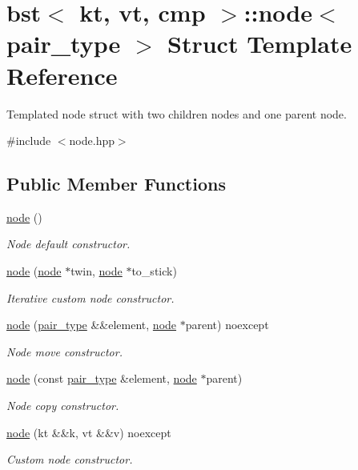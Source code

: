 \hypertarget{structbst_1_1node}{}\section{bst$<$ kt, vt, cmp $>$\+:\+:node$<$ pair\+\_\+type $>$ Struct Template Reference}
\label{structbst_1_1node}


Templated node struct with two children nodes and one parent node.  




{\ttfamily \#include $<$node.\+hpp$>$}

\subsection*{Public Member Functions}
\begin{DoxyCompactItemize}
\item 
\hyperlink{structbst_1_1node_a79aa79c3ff256126de5fdc848ec88b45}{node} ()
\begin{DoxyCompactList}\small\item\em Node default constructor. \end{DoxyCompactList}\item 
\hyperlink{structbst_1_1node_a87b48a3770bbaa16830f8bbb635edd38}{node} (\hyperlink{structbst_1_1node}{node} $\ast$twin, \hyperlink{structbst_1_1node}{node} $\ast$to\+\_\+stick)
\begin{DoxyCompactList}\small\item\em Iterative custom node constructor. \end{DoxyCompactList}\item 
\hyperlink{structbst_1_1node_afb49ebb92c139b1a3fdaf71048b0dc1a}{node} (\hyperlink{classbst_a7b11cca2a3b4394915600194f741ab16}{pair\+\_\+type} \&\&element, \hyperlink{structbst_1_1node}{node} $\ast$parent) noexcept
\begin{DoxyCompactList}\small\item\em Node move constructor. \end{DoxyCompactList}\item 
\hyperlink{structbst_1_1node_a9970c480ef885a64710303bc9e3e6558}{node} (const \hyperlink{classbst_a7b11cca2a3b4394915600194f741ab16}{pair\+\_\+type} \&element, \hyperlink{structbst_1_1node}{node} $\ast$parent)
\begin{DoxyCompactList}\small\item\em Node copy constructor. \end{DoxyCompactList}\item 
\hyperlink{structbst_1_1node_a16fb9a6092d387f08864f4c75ca312bb}{node} (kt \&\&k, vt \&\&v) noexcept
\begin{DoxyCompactList}\small\item\em Custom node constructor. \end{DoxyCompactList}\end{DoxyCompactItemize}
